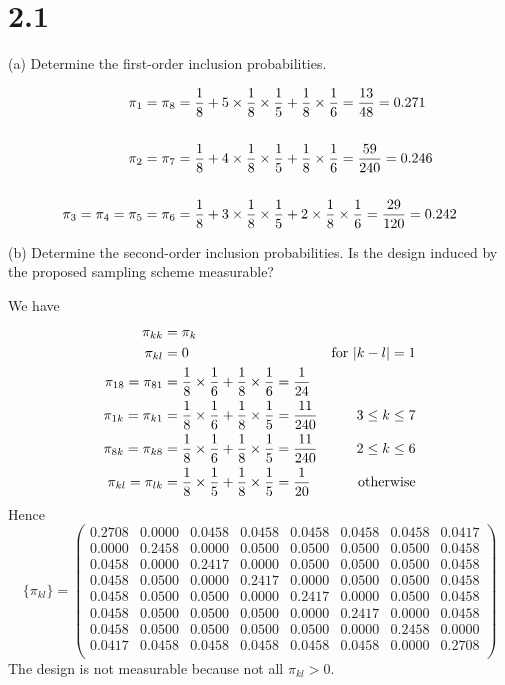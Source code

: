 \documentclass[12pt]{article}
\begin{document}
\section*{2.1}
(a) Determine the first-order inclusion probabilities.

\begin{align*}
\pi_1=\pi_8&={1\over 8}+5\times{1\over8}\times{1\over5}+{1\over8}
\times{1\over6}={13\over48}=0.271\\
\\
\pi_2=\pi_7&={1\over8}+4\times{1\over8}\times{1\over5}+{1\over8}
\times{1\over6}={59\over240}=0.246\\
\\
\pi_3=\pi_4=\pi_5=\pi_6&={1\over8}+3\times{1\over8}\times{1\over5}
+2\times{1\over8}\times{1\over6}={29\over120}=0.242
\end{align*}

(b) Determine the second-order inclusion probabilities.
Is the design induced by the proposed sampling scheme measurable?

We have
\begin{align*}
\pi_{kk}&=\pi_k\\
\pi_{kl}&=0&\hbox{for $|k-l|=1$}\\
\pi_{18}=\pi_{81}&={1\over8}\times{1\over6}+{1\over8}\times{1\over6}={1\over24}\\
\pi_{1k}=\pi_{k1}&={1\over8}\times{1\over6}+{1\over8}\times
{1\over5}={11\over240}&3\le k\le7\\
\pi_{8k}=\pi_{k8}&={1\over8}\times{1\over6}+{1\over8}\times
{1\over5}={11\over240}&2\le k\le6\\
\pi_{kl}=\pi_{lk}&={1\over8}\times{1\over5}+{1\over8}\times{1\over5}={1\over20}&
\hbox{otherwise}
\end{align*}
Hence
\[
\{\pi_{kl}\}=
\left(
\begin{array}{cccccccc}
 0.2708 &  0.0000 &  0.0458 &  0.0458 &  0.0458 &  0.0458 &  0.0458 &  0.0417\\
 0.0000 &  0.2458 &  0.0000 &  0.0500 &  0.0500 &  0.0500 &  0.0500 &  0.0458\\
 0.0458 &  0.0000 &  0.2417 &  0.0000 &  0.0500 &  0.0500 &  0.0500 &  0.0458\\
 0.0458 &  0.0500 &  0.0000 &  0.2417 &  0.0000 &  0.0500 &  0.0500 &  0.0458\\
 0.0458 &  0.0500 &  0.0500 &  0.0000 &  0.2417 &  0.0000 &  0.0500 &  0.0458\\
 0.0458 &  0.0500 &  0.0500 &  0.0500 &  0.0000 &  0.2417 &  0.0000 &  0.0458\\
 0.0458 &  0.0500 &  0.0500 &  0.0500 &  0.0500 &  0.0000 &  0.2458 &  0.0000\\
 0.0417 &  0.0458 &  0.0458 &  0.0458 &  0.0458 &  0.0458 &  0.0000 &  0.2708\\
\end{array}\right)
\]
The design is not measurable because not all $\pi_{kl}>0$.
\end{document}
